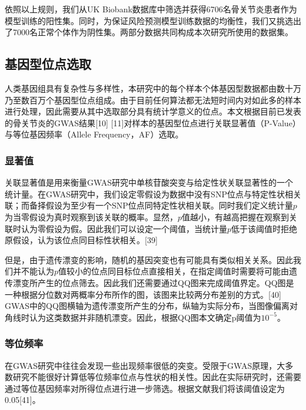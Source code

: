 \documentclass[
]{article}
\begin{document}
依照以上规则，我们从UK
Biobank数据库中筛选并获得6706名骨关节炎患者作为模型训练的阳性集。同时，为保证风险预测模型训练数据的均衡性，我们又挑选出了7000名正常个体作为阴性集。两部分数据共同构成本次研究所使用的数据集。

\hypertarget{ux57faux56e0ux578bux4f4dux70b9ux9009ux53d6}{%
\subsection{基因型位点选取}\label{ux57faux56e0ux578bux4f4dux70b9ux9009ux53d6}}

人类基因组具有复杂性与多样性，本研究中的每个样本个体基因型数据都由数十万乃至数百万个基因型位点组成。由于目前任何算法都无法短时间内对如此多的样本进行处理，因此需要从其中选取部分具有统计学意义的位点。本文根据目前已发表的骨关节炎的GWAS结果{[}10{]}
{[}11{]}对样本的基因型位点进行关联显著值（P-Value）与等位基因频率（Allele
Frequency，AF）选取。

\hypertarget{ux663eux8457ux503c}{%
\subsubsection{显著值}\label{ux663eux8457ux503c}}

关联显著值是用来衡量GWAS研究中单核苷酸突变与给定性状关联显著性的一个统计量。在GWAS研究中，我们设定零假设为数据中没有SNP位点与特定性状相关联；而备择假设为至少有一个SNP位点同特定性状相关联。同时我们定义统计量\(p\)为当零假设为真时观察到该关联的概率。显然，\(p\)值越小，有越高把握在观察到关联时认为零假设为假。因此我们可以设定一个阈值，当统计量\(p\)低于该阈值时拒绝原假设，认为该位点同目标性状相关。{[}39{]}

但是，由于遗传漂变的影响，随机的基因突变也有可能具有类似相关关系。因此我们并不能认为\(p\)值较小的位点同目标位点直接相关，在指定阈值时需要将可能由遗传漂变所产生的位点筛去。因此我们还需要通过QQ图来完成阈值界定。QQ图是一种根据分位数对两概率分布所作的图，该图来比较两分布差别的方式。{[}40{]}
GWAS中的QQ图横轴为遗传漂变所产生的分布，纵轴为实际分布，当图像偏离对角线时认为这类数据并非随机漂变。因此，根据QQ图本文确定p阈值为\(10^{-5}\)。

\hypertarget{ux7b49ux4f4dux9891ux7387}{%
\subsubsection{等位频率}\label{ux7b49ux4f4dux9891ux7387}}

在GWAS研究中往往会发现一些出现频率很低的突变。受限于GWAS原理，大多数研究不能很好计算低等位频率位点与性状的相关性。因此在实际研究时，还需要通过等位基因频率对所得位点进行进一步筛选。根据文献我们将该阈值设定为0.05{[}41{]}。
\end{document}
